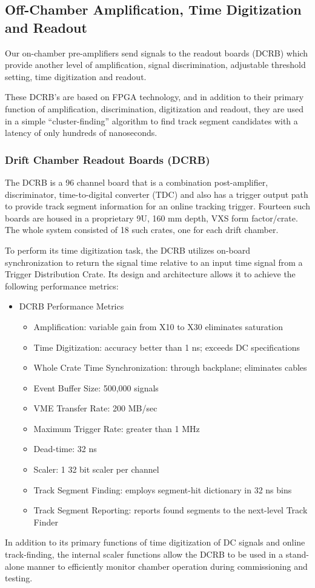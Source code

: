 \subsection{Off-Chamber Amplification, Time Digitization and Readout}

Our on-chamber 
pre-amplifiers send signals to the readout boards (DCRB) 
which provide another level of amplification, 
signal discrimination, adjustable threshold setting, time digitization
and readout. 

These DCRB's are based on FPGA technology, and in addition to
their primary function of amplification, discrimination, digitization
and readout, they are used in a simple ``cluster-finding'' algorithm
to find track segment candidates with a latency of only hundreds
of nanoseconds.

\subsubsection{Drift Chamber Readout Boards (DCRB)}

The DCRB is a 96 channel board that is a combination post-amplifier,
discriminator, time-to-digital converter (TDC) and also has a trigger
output path to provide track segment information for an online tracking trigger.
Fourteen such boards are housed in
a proprietary 9U, 160 mm depth, VXS form factor/crate.
The whole system consisted of 18 such crates, one for each drift chamber.

To perform its time digitization task, the DCRB utilizes on-board synchronization to
return the signal time relative to an input time signal from  a Trigger Distribution
Crate.
Its design and architecture
allows it to achieve the following performance metrics:
\begin{itemize}
\item DCRB Performance Metrics
\begin{itemize}
\item Amplification: variable gain from X10 to X30 eliminates saturation
\item Time Digitization: accuracy better than 1 ns; exceeds DC specifications
\item Whole Crate Time Synchronization: through backplane; eliminates cables
\item Event Buffer Size: 500,000 signals
\item VME Transfer Rate: 200 MB/sec
\item Maximum Trigger Rate: greater than 1 MHz
\item Dead-time: 32 ns
\item Scaler: 1 32 bit scaler per channel
\item Track Segment Finding: employs segment-hit dictionary in 32 ns bins
\item Track Segment Reporting: reports found segments to the next-level Track Finder
\end{itemize}
\end{itemize}

In addition to its primary functions of time digitization of DC signals and online
track-finding, the internal scaler functions allow the DCRB to be used in 
a stand-alone manner to efficiently monitor chamber operation during commissioning
and testing.

